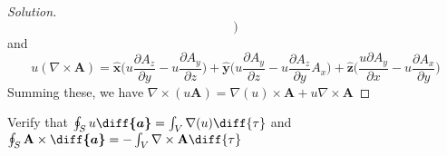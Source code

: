 \documentclass[crop=false,class=article,oneside]{standalone}
\begin{document}
\begin{proof}[Solution]
\begin{equation*}
                \big)
            \end{equation*}
            and
            \begin{equation*}
                u(\nabla\times\mathbf{A})
                =\hat{\mathbf{x}}\big(
                    u\frac{\partial{A_{z}}}{\partial{y}}
                    -u\frac{\partial{A_{y}}}{\partial{z}}
                \big)
                +\hat{\mathbf{y}}\big(
                    u\frac{\partial{A_{y}}}{\partial{z}}
                    -u\frac{\partial{A_{z}}}{\partial{y}}A_{x}
                \big)
                +\hat{\mathbf{z}}\big(
                    \frac{u\partial{A_{y}}}{\partial{x}}
                    -u\frac{\partial{A_{x}}}{\partial{y}}
                \big)
            \end{equation*}
            Summing these, we have
            $\nabla\times(u\mathbf{A})%
             =\nabla(u)\times\mathbf{A}%
             +u\nabla\times\mathbf{A}$
        \end{proof}
        \begin{problem}[Wangsness 1-26]
            Verify that
            $\oint_{S}u\boldsymbol{\diff{a}}%
             =\int_{V}\nabla(u)\diff{\tau}$
            and
            $\oint_{S}\mathbf{A}\times\boldsymbol{\diff{a}}%
             =-\int_{V}\nabla\times\mathbf{A}\diff{\tau}$
        \end{problem}
\end{document}
